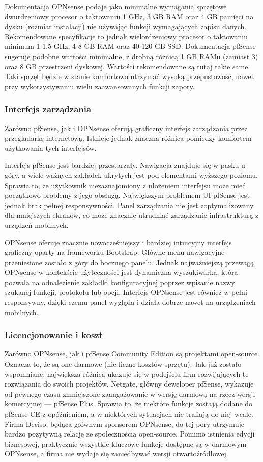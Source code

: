 \documentclass[12pt,a4paper]{article}
\begin{document}
Dokumentacja OPNsense podaje jako minimalne wymagania sprzętowe dwurdzeniowy procesor o taktowaniu 1 GHz, 3 GB RAM oraz 4 GB pamięci na dysku (rozmiar instalacji) nie używając funkcji wymagających zapisu danych. Rekomendowane specyfikacje to jednak wielordzeniowy procesor o taktowaniu minimum 1-1.5 GHz, 4-8 GB RAM oraz 40-120 GB SSD. Dokumentacja pfSense sugeruje podobne wartości minimalne, z drobną różnicą 1 GB RAMu (zamiast 3) oraz 8 GB przestrzeni dyskowej. Wartości rekomendowane są tutaj takie same. Taki sprzęt będzie w stanie komfortowo utrzymać wysoką przepustowość, nawet przy wykorzystywaniu wielu zaawansowanych funkcji zapory.

\subsubsection{Interfejs zarządzania}
Zarówno pfSense, jak i OPNsense oferują graficzny interfejs zarządzania przez przeglądarkę internetową. Istnieje jednak znaczna różnica pomiędzy komfortem użytkowania tych interfejsów.

Interfejs pfSense jest bardziej przestarzały. Nawigacja znajduje się w pasku u góry, a wiele ważnych zakładek ukrytych jest pod elementami wyższego poziomu. Sprawia to, że użytkownik niezaznajomiony z ułożeniem interfejsu może mieć początkowo problemy z jego obsługą. Największym problemem UI pfSense jest jednak brak pełnej responsywności. Panel zarządzania nie jest zoptymalizowany dla mniejszych ekranów, co może znacznie utrudniać zarządzanie infrastrukturą z urządzeń mobilnych.

OPNsense oferuje znacznie nowocześniejszy i bardziej intuicyjny interfejs graficzny oparty na frameworku Bootstrap. Główne menu nawigacyjne przeniesione zostało z góry do bocznego panelu. Jednak najważniejszą przewagą OPNsense w kontekście użyteczności jest dynamiczna wyszukiwarka, która pozwala na odnalezienie zakładki konfiguracyjnej poprzez wpisanie nazwy szukanej funkcji, protokołu lub opcji. Interfejs OPNsense jest również w pełni responsywny, dzięki czemu panel wygląda i działa dobrze nawet na urządzeniach mobilnych.

\subsubsection{Licencjonowanie i koszt}
Zarówno OPNsense, jak i pfSense Community Edition są projektami open-source. Oznacza to, że są one darmowe (nie licząc kosztów sprzętu). Jak już zostało wspomniane, największa różnica ukazuje się w podejściu firm rozwijających te rozwiązania do swoich projektów. Netgate, główny deweloper pfSense, wykazuje od pewnego czasu zmniejszone zaangażowanie w wersję darmową na rzecz wersji komercyjnej --- pfSense Plus. Sprawia to, że niektóre funkcje zostają dodane do pfSense CE z opóźnieniem, a w niektórych sytuacjach nie trafiają do niej wcale. Firma Deciso, będąca głównym sponsorem OPNsense, do tej pory utrzymuje bardzo pozytywną relację ze społecznością open-source. Pomimo istnienia edycji biznesowej, praktycznie wszystkie kluczowe funkcje dostępne są w darmowym OPNsense, a firma nie wydaje się zaniedbywać wersji otwartoźródłowej.
\end{document}
